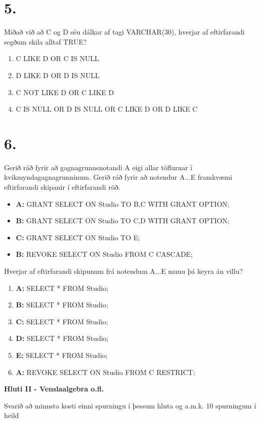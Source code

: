 \documentclass{article}
\newcommand{\bo}[1]{\textbf{#1}}
\newcommand{\enum}{\begin{enumerate}[label = \alph*.]}
\begin{document}
\section{5.}
Miðað við að C og D séu dálkar af tagi VARCHAR(30), hverjar af
eftirfarandi segðum skila alltaf TRUE?

\enum
\item C LIKE D OR C IS NULL
\item D LIKE D OR D IS NULL
\item C NOT LIKE D OR C LIKE D
\item C IS NULL OR D IS NULL OR C LIKE D OR D LIKE C
\end{enumerate}

\newpage

\section{6.}
Gerið ráð fyrir að gagnagrunnsnotandi A eigi allar töflurnar í
kvikmyndagagnagrunninum. Gerið ráð fyrir að notendur A...E
framkvæmi eftirfarandi skipanir í eftirfarandi röð.

\begin{itemize}
\item \bo{A:} GRANT SELECT ON Studio TO B,C WITH GRANT OPTION;
\item \bo{B:} GRANT SELECT ON Studio TO C,D WITH GRANT OPTION;
\item \bo{C:} GRANT SELECT ON Studio TO E;
\item \bo{B:} REVOKE SELECT ON Studio FROM C CASCADE;
\end{itemize}
Hverjar af eftirfarandi skipunum frá notendum A...E munu þá keyra
án villu?
\enum
    \item \bo{A:} SELECT * FROM Studio;
    \item \bo{B:} SELECT * FROM Studio;
    \item \bo{C:} SELECT * FROM Studio;
    \item \bo{D:} SELECT * FROM Studio; 
    \item \bo{E:} SELECT * FROM Studio;
    \item \bo{A:} REVOKE SELECT ON Studio FROM C RESTRICT;
\end{enumerate}

\newpage

\begin{center}
    \bo{Hluti II - Venslaalgebra o.fl.}

    Svarið að minnsta kosti einni spurningu í þessum hluta og a.m.k.
    10 spurningum í heild
\end{center}
\end{document}
